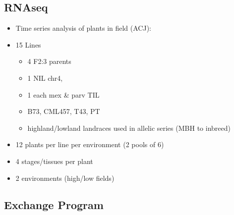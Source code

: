 \subsection{RNAseq}
\begin{itemize}
\item Time series analysis of plants in field (ACJ):
\item 15 Lines
\begin{itemize}
\item 4 F2:3 parents
\item 1 NIL chr4,
\item 1 each mex \& parv TIL
\item B73, CML457, T43, PT
\item highland/lowland landraces used in allelic series (MBH to inbreed)
\end{itemize}
\item 12 plants per line per environment (2 pools of 6)
\item 4 stages/tissues per plant
\item 2 environments (high/low fields)
\end{itemize}



\setcounter{section}{1}


\subsection*{Exchange Program} 

